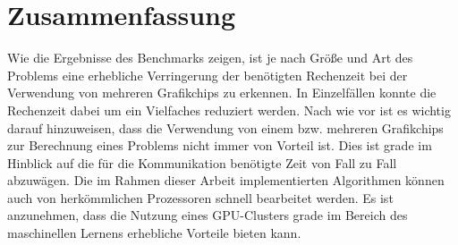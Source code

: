 \documentclass[doktyp=semarbeit, sprache=german]{TUBAFarbeiten}
\begin{document}
\section{Zusammenfassung}
Wie die Ergebnisse des Benchmarks zeigen, ist je nach Größe und Art des Problems eine erhebliche Verringerung der benötigten Rechenzeit bei der Verwendung von mehreren Grafikchips zu erkennen. In Einzelfällen konnte die Rechenzeit dabei um ein Vielfaches reduziert werden. Nach wie vor ist es wichtig darauf hinzuweisen, dass die Verwendung von einem bzw. mehreren Grafikchips zur Berechnung eines Problems nicht immer von Vorteil ist. Dies ist grade im Hinblick auf die für die Kommunikation benötigte Zeit von Fall zu Fall abzuwägen. Die im Rahmen dieser Arbeit implementierten Algorithmen können auch von herkömmlichen Prozessoren schnell bearbeitet werden. Es ist anzunehmen, dass die Nutzung eines GPU-Clusters grade im Bereich des maschinellen Lernens erhebliche Vorteile bieten kann. 
\newpage
{} 
\end{document}
